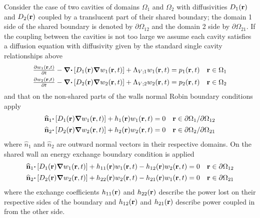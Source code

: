 \documentclass[a4paper]{article}
\numberwithin{equation}{section}
\begin{document}
Consider the case of two cavities of domains $\Omega_1$ and $\Omega_2$ with
diffusivities $D_1\pr$ and $D_2\pr$ coupled by a translucent part of their 
shared boundary; the domain 1 side of the shared boundary is denoted by 
${\partial}\Omega_{12}$ and the domain 2 side by ${\partial}\Omega_{21}$.
If the coupling between the cavities is not too large we assume each cavity 
satisfies a diffusion equation with diffusivity given by the standard single 
cavity relationships above
\begin{align}
\begin{matrix}
\frac{{\partial}w_1\prt}{{\partial}t}-{\vnabla}{\vcdot}\left[D_1\pr{\vnabla}w_1\prt\right]+\Lambda_{V;1}w_1\prt = p_1\prt &\vr\in\Omega_1
\end{matrix} \\
\begin{matrix}
\frac{{\partial}w_2\prt}{{\partial}t}-{\vnabla}{\vcdot}\left[D_2\pr{\vnabla}w_2\prt\right]+\Lambda_{V;2}w_2\prt = p_2\prt &\vr\in\Omega_2
\end{matrix}
\end{align}
and that on the non-shared parts of the walls normal Robin boundary conditions
apply
\begin{align}
\begin{matrix}
\uvn_1{\vcdot}\left[D_1\pr{\vnabla}w_1\prt\right]+h_1\pr w_1\prt = 0 &\vr\in\partial\Omega_1/\partial\Omega_{12}
\end{matrix}\\
\begin{matrix}
\uvn_2{\vcdot}\left[D_2\pr{\vnabla}w_2\prt\right]+h_2\pr w_2\prt = 0 &\vr\in\partial\Omega_2/\partial\Omega_{21}
\end{matrix}
\end{align}
where  $\widehat  n_1$ and  $\widehat  n_2$ are outward normal vectors in their
respective domains. On the shared wall an energy exchange boundary condition is
applied
\begin{align}
\begin{matrix}
\uvn_1{\vcdot}\left[D_1\pr{\vnabla}w_1\prt\right]+h_{11}\pr w_1\prt-h_{12}\pr w_2\prt = 0 &\vr\in\partial\Omega_{12}
\end{matrix}\\
\begin{matrix}
\uvn_2{\vcdot}\left[D_2\pr{\vnabla}w_2\prt\right]+h_{22}\pr w_2\prt-h_{21}\pr w_1\prt = 0 &\vr\in\partial\Omega_{21}
\end{matrix}
\end{align}
where the exchange coefficients $h_{11}\pr$ and $h_{22}\pr$ describe the power lost 
on their respective sides of the boundary and $h_{12}\pr$ and $h_{21}\pr$ describe power
coupled in from the other side.
\end{document}
